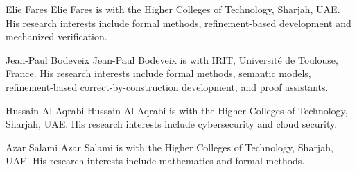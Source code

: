 \documentclass{ieeeaccess}
\begin{document}


\begin{IEEEbiographynophoto}{Elie Fares}
Elie Fares is with the Higher Colleges of Technology, Sharjah, UAE. His
research interests include formal methods, refinement-based development and mechanized verification.
\end{IEEEbiographynophoto}
\begin{IEEEbiographynophoto}{Jean-Paul Bodeveix}
Jean-Paul Bodeveix is with IRIT, Universit\'e de Toulouse, France. His research
interests include formal methods, semantic models, refinement-based correct-by-construction development, and proof assistants.
\end{IEEEbiographynophoto}
\begin{IEEEbiographynophoto}{Hussain Al-Aqrabi}
Hussain Al-Aqrabi is with the Higher Colleges of Technology, Sharjah, UAE. His
research interests include cybersecurity and cloud security.
\end{IEEEbiographynophoto}
\begin{IEEEbiographynophoto}{Azar Salami}
Azar Salami is with the Higher Colleges of Technology, Sharjah, UAE. His research interests
include mathematics and formal methods.\EOD
\end{IEEEbiographynophoto}
\end{document}
